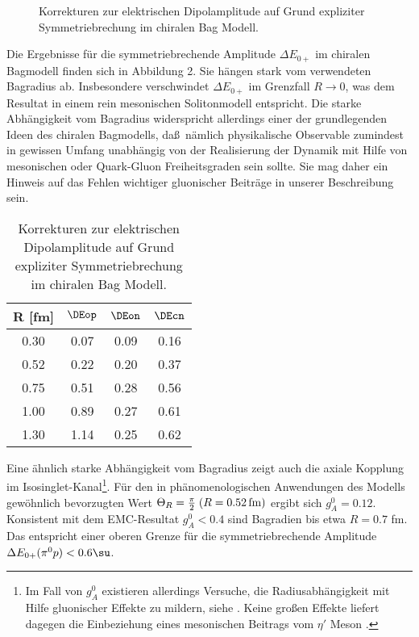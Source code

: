 \begin{figure}
\caption{Korrekturen zur elektrischen Dipolamplitude auf Grund expliziter 
Symmetriebrechung im chiralen Bag Modell.}
\vspace{8cm}
\end{figure}

Die Ergebnisse f\"ur die symmetriebrechende Amplitude $\Delta E_{0+}$
im chiralen Bagmodell finden sich in Abbildung 2. Sie h\"angen stark vom
verwendeten Bagradius ab. Insbesondere verschwindet $\Delta E_{0+}$
im Grenzfall $R\to 0$, was dem Resultat in einem rein mesonischen 
Solitonmodell entspricht. Die starke Abh\"angigkeit vom Bagradius
widerspricht allerdings einer der grundlegenden Ideen des chiralen 
Bagmodells, da\ss\ n\"amlich physikalische Observable zumindest in
gewissen Umfang unabh\"angig von der Realisierung der Dynamik mit Hilfe
von mesonischen oder Quark-Gluon Freiheitsgraden sein sollte. Sie mag 
daher ein Hinweis auf das Fehlen wichtiger gluonischer Beitr\"age in 
unserer Beschreibung sein.
     
\begin{table}
\caption{Korrekturen zur elektrischen Dipolamplitude auf Grund expliziter 
Symmetriebrechung im chiralen Bag Modell.} 
\begin{center}
\begin{tabular}{|c||c|c|c|}\hline
 R [fm]   & $\DEop$         & $\DEon$       & $\DEcn$        \\ \hline\hline
 0.30     &   0.07          &    0.09       &   0.16         \\ 
 0.52     &   0.22          &    0.20       &   0.37         \\  
 0.75     &   0.51          &    0.28       &   0.56         \\  
 1.00     &   0.89          &    0.27       &   0.61         \\ 
 1.30     &   1.14          &    0.25       &   0.62        \\ \hline
\end{tabular}
\end{center}
\end{table} 

Eine \"ahnlich starke Abh\"angigkeit vom Bagradius zeigt auch die
axiale Kopplung im Isosinglet-Kanal\footnote{Im Fall von $g_A^0$
existieren allerdings Versuche, die Radiusabh\"angigkeit mit Hilfe
gluonischer Effekte zu mildern, siehe \cite{PV89}. Keine gro\ss en
Effekte liefert dagegen die Einbeziehung eines mesonischen Beitrags
vom $\eta '$ Meson \cite{HW89}.}.  F\"ur den in ph\"anomenologischen
Anwendungen des Modells gew\"ohnlich bevorzugten Wert $\Theta_R=
\frac{\pi}{2}\;(R=0.52\,\rm fm)$ ergibt sich $g_A^0=0.12$. 
Konsistent mit dem  EMC-Resultat $g_A^0<0.4$ sind Bagradien bis etwa
$R=0.7$ fm. Das entspricht einer oberen Grenze f\"ur die
symmetriebrechende Amplitude $\Delta E_{0+}(\pi^0p)<0.6 \su$.    

